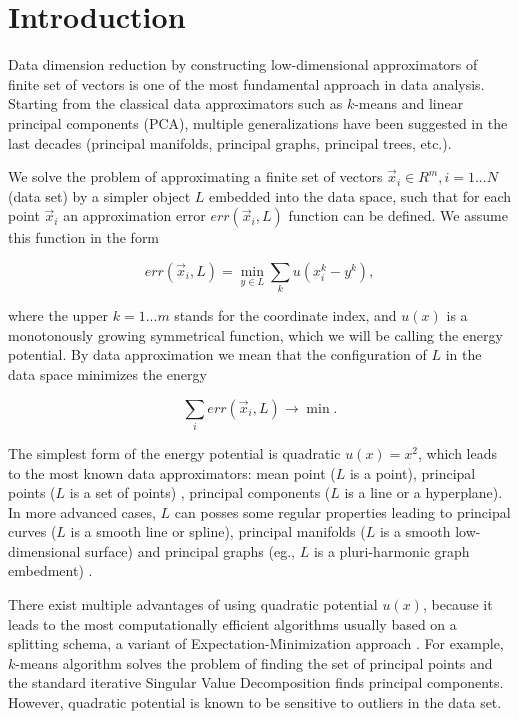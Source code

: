 \documentclass[preprint,12pt]{elsarticle}
\begin{document}

\section{Introduction}
\label{S:1}

Data dimension reduction by constructing low-dimensional approximators of finite set of vectors is one of the most fundamental approach in data analysis. Starting from the classical data approximators such as $k$-means and linear principal components (PCA), multiple generalizations have been suggested in the last decades (principal manifolds, principal graphs, principal trees, etc.)\cite{Gorban2008Principal}.

We solve the problem of approximating a finite set of vectors ${\vec{x}_i}\in R^m,i=1...N$ (data set) by a simpler object $L$ embedded into the data space, such that for each point $\vec{x}_i$ an approximation error $err(\vec{x}_i,L)$ function can be defined. We assume this function in the form

\begin{equation}\label{distance_function}
err(\vec{x}_i,L) = \min_{y\in L} \sum_k u(x_i^k-y^k),
\end{equation}

\noindent where the upper $k=1...m$ stands for the coordinate index, and $u(x)$ is a monotonously growing symmetrical function, which we will be calling the energy potential. By data approximation we mean that the configuration of $L$ in the data space minimizes the energy

$$
\sum_i err(\vec{x}_i,L) \rightarrow \min.
$$

The simplest form of the energy potential is quadratic $u(x)=x^2$, which leads to the most known data approximators: mean point ($L$ is a point), principal points ($L$ is a set of points) \cite{???}, principal components ($L$ is a line or a hyperplane). In more advanced cases, $L$ can posses some regular properties leading to principal curves ($L$ is a smooth line or spline), principal manifolds ($L$ is a smooth low-dimensional surface) and principal graphs (eg., $L$ is a pluri-harmonic graph embedment) \cite{Gorban2009}.

There exist multiple advantages of using quadratic potential $u(x)$, because it leads to the most computationally efficient algorithms usually based on a splitting schema, a variant of Expectation-Minimization approach \cite{Gorban2009}. For example, $k$-means algorithm solves the problem of finding the set of principal points and the standard iterative Singular Value Decomposition finds principal components. However, quadratic potential is known to be sensitive to outliers in the data set.
\end{document}
